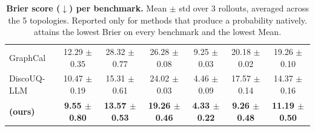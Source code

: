 \begin{table}[!t]
{\begin{tabular}{l c c c c c c}
GraphCal            & 12.29 {\scriptsize $\pm$ 0.35} & 28.32 {\scriptsize $\pm$ 0.77} & 26.28 {\scriptsize $\pm$ 0.08} &  9.25 {\scriptsize $\pm$ 0.03} & 20.18 {\scriptsize $\pm$ 0.02} & 19.26 {\scriptsize $\pm$ 0.10} \\
DiscoUQ-LLM         & 10.47 {\scriptsize $\pm$ 0.19} & 15.31 {\scriptsize $\pm$ 0.61} & 24.02 {\scriptsize $\pm$ 0.03} &  4.46 {\scriptsize $\pm$ 0.09} & 17.57 {\scriptsize $\pm$ 0.14} & 14.37 {\scriptsize $\pm$ 0.16} \\
\midrule
\rowcolor[RGB]{222,230,241}
\textbf{\methodname{} (ours)}
                    & \textbf{ 9.55 {\scriptsize $\pm$ 0.80}} & \textbf{13.57 {\scriptsize $\pm$ 0.53}} & \textbf{19.26 {\scriptsize $\pm$ 0.46}} & \textbf{ 4.33 {\scriptsize $\pm$ 0.22}} & \textbf{ 9.26 {\scriptsize $\pm$ 0.48}} & \textbf{11.19 {\scriptsize $\pm$ 0.50}} \\
\bottomrule
\end{tabular}%
}
\caption{\textbf{Brier score ($\downarrow$) per benchmark.}
Mean $\pm$ std over 3 rollouts, averaged across the 5
topologies. Reported only for methods that produce a probability
natively. \methodname{} attains the lowest Brier on every
benchmark and the lowest Mean.}
\label{tab:brier}
\end{table}

